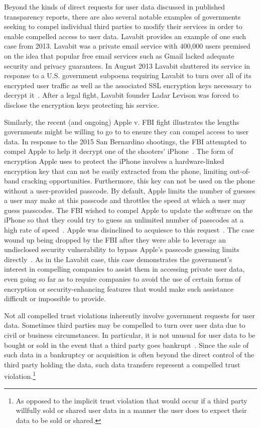 Beyond the kinds of direct requests for user data discussed in
published transparency reports, there are also several notable
examples of governments seeking to compel individual third parties to
modify their services in order to enable compelled access to user
data. Lavabit provides an example of one such case from 2013. Lavabit
was a private email service with 400,000 users premised on the idea
that popular free email services such as Gmail lacked adequate
security and privacy guarantees. In August 2013 Lavabit shuttered its
service in response to a U.S. government subpoena requiring Lavabit to
turn over all of its encrypted user traffic as well as the associated
SSL encryption keys necessary to decrypt it~\cite{lavabit,
  levsion-lavabit}. After a legal fight, Lavabit founder Ladar Levison
was forced to disclose the encryption keys protecting his service.

Similarly, the recent (and ongoing) Apple v. FBI fight illustrates the
lengths governments might be willing to go to to ensure they can
compel access to user data.  In response to the 2015 San Bernardino
shootings, the FBI attempted to compel Apple to help it decrypt one of
the shooters' iPhone~\cite{ars-cookvfbi}. The form of encryption Apple
uses to protect the iPhone involves a hardware-linked encryption key
that can not be easily extracted from the phone, limiting out-of-band
cracking opportunities. Furthermore, this key can not be used on the
phone without a user-provided passcode. By default, Apple limits the
number of guesses a user may make at this passcode and throttles the
speed at which a user may guess passcodes. The FBI wished to compel
Apple to update the software on the iPhone so that they could try to
guess an unlimited number of passcodes at a high rate of
speed~\cite{eff-applecrypto}. Apple was disinclined to acquiesce to
this request~\cite{apple-fbiletter}. The case wound up being dropped
by the FBI after they were able to leverage an undisclosed security
vulnerability to bypass Apple's passcode guessing limits
directly~\cite{ars-fbi-breakthrough, ars-fbi-greyhats}. As in the
Lavabit case, this case demonstrates the government's interest in
compelling companies to assist them in accessing private user data,
even going so far as to require companies to avoid the use of certain
forms of encryption or security-enhancing features that would make
such assistance difficult or impossible to provide.

Not all compelled trust violations inherently involve government
requests for user data. Sometimes third parties may be compelled to
turn over user data due to civil or business circumstances. In
particular, it is not unusual for user data to be bought or sold in
the event that a third party goes bankrupt~\cite{nguyen2004,
  singer2015, solove2015}. Since the sale of such data in a bankruptcy
or acquisition is often beyond the direct control of the third party
holding the data, such data transfers represent a compelled trust
violation.\footnote{As opposed to the implicit trust violation that
  would occur if a third party willfully sold or shared user data in a
  manner the user does to expect their data to be sold or shared.}

